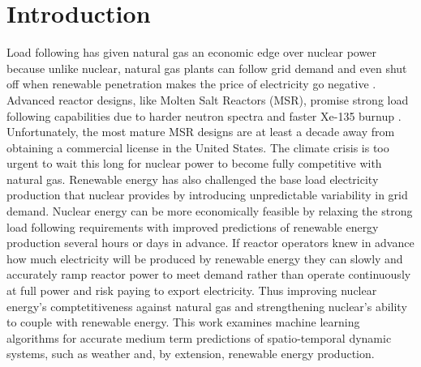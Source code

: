 \section{Introduction}

Load following has given natural gas an economic edge over nuclear power
because unlike nuclear,
natural gas plants can follow grid demand and even shut off when renewable
penetration makes the
price of electricity go negative \cite{keppler_carbon_2011}. Advanced reactor
designs, like Molten Salt
Reactors (MSR), promise strong load following capabilities due to harder
neutron spectra and faster Xe-135 burnup \cite{rykhlevskii_impact_2019}.
Unfortunately, the most mature MSR
designs are at least a decade away from obtaining a commercial license in the
United States. The climate crisis is too urgent to wait this long for nuclear
power to become fully competitive with natural gas.
Renewable energy has also challenged the base load electricity production that
nuclear provides by introducing unpredictable variability in grid demand.
Nuclear energy can be more economically feasible by relaxing the strong load
following requirements
with improved predictions of renewable energy production several hours or days
in advance. If reactor operators knew in advance how much electricity will be
produced by renewable energy they
can slowly and accurately ramp reactor power to meet demand rather than operate
continuously at full power and risk paying to export electricity. Thus
improving nuclear energy's comptetitiveness against natural gas and
strengthening nuclear's ability to couple with renewable energy.
This work examines machine learning algorithms for accurate medium term
predictions of spatio-temporal dynamic systems, such as weather and, by
extension, renewable energy production.

